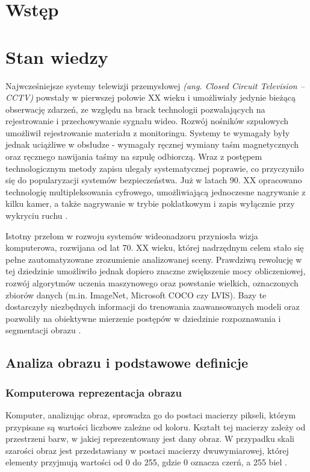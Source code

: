 \chapter{Wstęp}\label{chap:wprowadzenie}

\chapter{Stan wiedzy}\label{chap:stan_wiedzy}
Najwcześniejsze systemy telewizji przemysłowej \textit{(ang. Closed Circuit Television -- CCTV)}
powstały w pierwszej połowie XX wieku i umożliwiały jedynie bieżącą obserwację zdarzeń, ze względu
na brack technologii pozwalających na rejestrowanie i przechowywanie sygnału wideo. Rozwój nośników
szpulowych umożliwił rejestrowanie materiału z monitoringu. Systemy te wymagały były jednak
uciążliwe w obsłudze - wymagały ręcznej wymiany taśm magnetycznych oraz ręcznego nawijania taśmy na
szpulę odbiorczą. Wraz z postępem technologicznym metody zapisu ulegały systematycznej poprawie, co
przyczyniło się do popularyzacji systemów bezpieczeństwa. Już w latach 90. XX opracowano
technologię multipleksowania cyfrowego, umożliwiającą jednoczesne nagrywanie z kilku kamer, a także
nagrywanie w trybie poklatkowym i zapis wyłącznie przy wykryciu ruchu \cite{kreugle}.

Istotny przełom w rozwoju systemów wideonadzoru przyniosła wizja komputerowa, rozwijana od lat 70.
XX wieku, której nadrzędnym celem stało się pełne zautomatyzowane zrozumienie analizowanej sceny.
Prawdziwą rewolucję w tej dziedzinie umożliwiło jednak dopiero znaczne zwiększenie mocy
obliczeniowej, rozwój algorytmów uczenia maszynowego oraz powstanie wielkich, oznaczonych zbiorów
danych (m.in. ImageNet, Microsoft COCO czy LVIS). Bazy te dostarczyły niezbędnych informacji do
trenowania zaawansowanych modeli oraz pozwoliły na obiektywne mierzenie postępów w dziedzinie
rozpoznawania i segmentacji obrazu \cite{szeliski2022}.


\section{Analiza obrazu i podstawowe definicje}

\subsection{Komputerowa reprezentacja obrazu}
Komputer, analizując obraz, sprowadza go do postaci macierzy pikseli, którym przypisane są wartości
liczbowe zależne od koloru. Kształt tej macierzy zależy od przestrzeni barw, w jakiej
reprezentowany jest dany obraz. W przypadku skali szarości obraz jest przedstawiany w postaci
macierzy dwuwymiarowej, której elementy przyjmują wartości od 0 do 255, gdzie 0 oznacza czerń, a
255 biel \cite{gonzalezwoods}.


